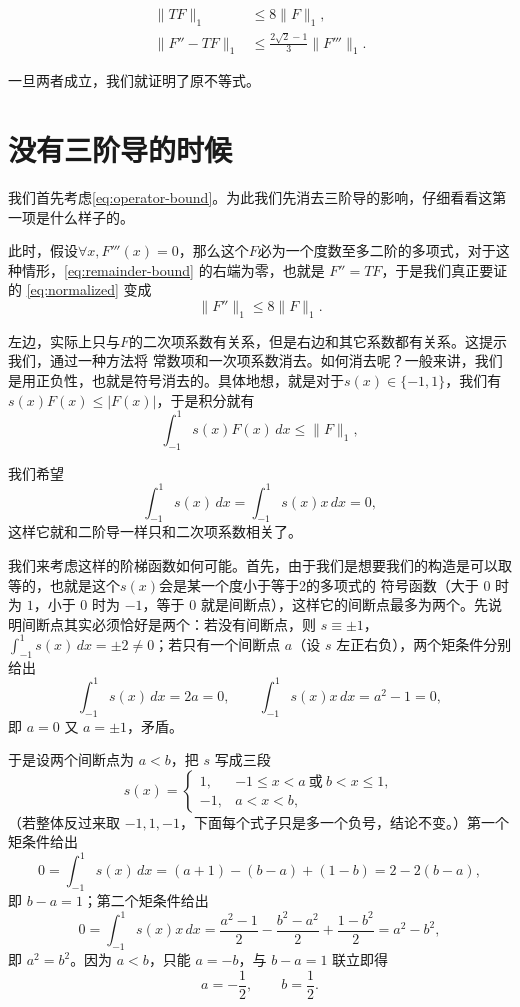 \documentclass[UTF8,fontset=windows,a4paper,11pt]{ctexart}
\newcommand{\Lone}[1]{\lVert #1\rVert_1}
\begin{document}
\begin{align}
    \Lone{TF}
    &\le 8\Lone{F},
    \label{eq:operator-bound}\\
    \Lone{F''-TF}
    &\le \frac{2\sqrt{2}-1}{3}\Lone{F'''}.
    \label{eq:remainder-bound}
\end{align}

一旦两者成立，我们就证明了原不等式。



\section{没有三阶导的时候}
\label{sec:quadratic}
我们首先考虑\eqref{eq:operator-bound}。为此我们先消去三阶导的影响，仔细看看这第一项是什么样子的。

此时，假设$\forall x, F'''(x)=0$，那么这个$F$必为一个度数至多二阶的多项式，对于这种情形，\eqref{eq:remainder-bound} 的右端为零，也就是 $F''=TF$，于是我们真正要证的 \eqref{eq:normalized} 变成
\[
    \Lone{F''}\le 8\Lone{F}.
\]

左边，实际上只与$F$的二次项系数有关系，但是右边和其它系数都有关系。这提示我们，通过一种方法将
常数项和一次项系数消去。如何消去呢？一般来讲，我们是用正负性，也就是符号消去的。具体地想，就是对于$s(x)\in\{-1,1\}$，我们有
$s(x)F(x)\le|F(x)|$，于是积分就有
\[
    \int_{-1}^{1}s(x)F(x)\,dx\le \Lone{F},
\]

我们希望
\[
    \int_{-1}^{1}s(x)\,dx=\int_{-1}^{1}s(x)x\,dx=0,
\]
这样它就和二阶导一样只和二次项系数相关了。

我们来考虑这样的阶梯函数如何可能。首先，由于我们是想要我们的构造是可以取等的，也就是这个$s(x)$会是某一个度小于等于2的多项式的
符号函数（大于 $0$ 时为 $1$，小于 $0$ 时为 $-1$，等于 $0$ 就是间断点），这样它的间断点最多为两个。先说明间断点其实必须恰好是两个：若没有间断点，则 $s\equiv\pm1$，$\displaystyle\int_{-1}^{1}s(x)\,dx=\pm2\neq0$；若只有一个间断点 $a$（设 $s$ 左正右负），两个矩条件分别给出
\[
    \int_{-1}^{1}s(x)\,dx=2a=0,\qquad \int_{-1}^{1}s(x)x\,dx=a^2-1=0,
\]
即 $a=0$ 又 $a=\pm1$，矛盾。

于是设两个间断点为 $a<b$，把 $s$ 写成三段
\[
    s(x)=
    \begin{cases}
        1, & -1\le x<a\ \text{或}\ b<x\le 1,\\[2pt]
        -1, & a<x<b,
    \end{cases}
\]
（若整体反过来取 $-1,1,-1$，下面每个式子只是多一个负号，结论不变。）第一个矩条件给出
\[
    0=\int_{-1}^{1}s(x)\,dx=(a+1)-(b-a)+(1-b)=2-2(b-a),
\]
即 $b-a=1$；第二个矩条件给出
\[
    0=\int_{-1}^{1}s(x)x\,dx=\frac{a^2-1}{2}-\frac{b^2-a^2}{2}+\frac{1-b^2}{2}=a^2-b^2,
\]
即 $a^2=b^2$。因为 $a<b$，只能 $a=-b$，与 $b-a=1$ 联立即得
\[
    a=-\frac12,\qquad b=\frac12.
\]
\end{document}

